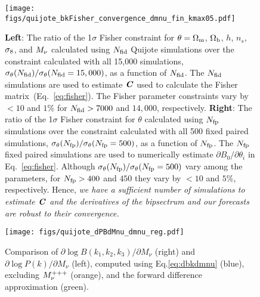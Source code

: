 \begin{figure}
\begin{center}
    \texttt{[image: figs/quijote\_bkFisher\_convergence\_dmnu\_fin\_kmax05.pdf]}
    \caption{{\bf Left}: The ratio of the 1$\sigma$ Fisher constraint for $\theta=\Omega_{\rm m}$, 
    $\Omega_{\rm b}$, $h$, $n_s$, $\sigma_8$, and $M_\nu$ calculated using $N_{\rm fid}$ Quijote 
    simulations over the constraint calculated with all 15,000 simulations, 
    $\sigma_\theta(N_{\rm fid})/\sigma_\theta(N_{\rm fid} = 15,000)$, as a 
    function of $N_{\rm fid}$. The $N_{\rm fid}$ simulations are used to estimate 
    $\textbf{\textit{C}}$ used to calculate the Fisher matrix~(Eq.~\ref{eq:fisher}). The Fisher
    parameter constraints vary by $<10$ and $1\%$ for $N_{\rm fid} > 7000$ and 
    $14,000$, respectively. 
    {\bf Right}: The ratio of the 1$\sigma$ Fisher constraint for $\theta$ 
    calculated using  $N_{\rm fp}$ simulations over the constraint calculated with 
    all 500 fixed paired simulations, $\sigma_\theta(N_{\rm fp})/\sigma_\theta(N_{\rm fp} = 500)$, 
    as a function of $N_{\rm fp}$. The $N_{\rm fp}$ fixed paired simulations are 
    used to numerically estimate $\partial B_0/\partial \theta_i$ in Eq.~\ref{eq:fisher}. 
    Although $\sigma_\theta(N_{\rm fp})/\sigma_\theta(N_{\rm fp} = 500)$ vary among 
    the parameters, for $N_{\rm fp} > 400$ and $450$ they vary by $< 10$ and $5\%$, 
    respectively. Hence, {\em we have a sufficient number of simulations to estimate 
    $\textbf{\textit{C}}$ and the derivatives of the bipsectrum and our forecasts are robust to 
    their convergence.} 
    }
\label{fig:converge}
\end{center}
\end{figure}

\begin{figure}
\begin{center}
    \texttt{[image: figs/quijote\_dPBdMnu\_dmnu\_reg.pdf]} 
    \caption{Comparison of $\partial \log B(k_1, k_2, k_3)/\partial M_\nu$ (right) 
    and $\partial \log P(k)/\partial M_\nu$ (left), computed using Eq.\ref{eq:dbkdmnu} (blue), 
    excluding $M_\nu^{+++}$ (orange), and the forward difference approximation (green). 
    }
\label{fig:dPBdmnu}
\end{center}
\end{figure}
